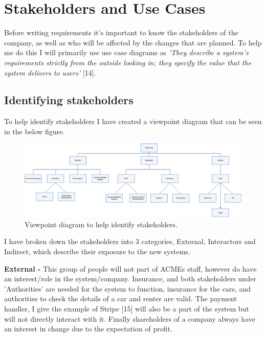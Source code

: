 \section{Stakeholders and Use Cases}
  Before writing requirements it's important to know the stakeholders of the company, as well as who will be affected by the changes that are planned.
  To help me do this I will primarily use use case diagrams as \textit{'They describe a system's requirements strictly from the outside looking in;
  they specify the value that the system delivers to users'} [14].

  \subsection{Identifying stakeholders}
    To help identify stakeholders I have created a viewpoint diagram that can be seen in the below figure.
    \begin{figure}[H]
      \centering
      \includegraphics[width=12cm]{diagrams/viewpoints.drawio.png}
      \caption{Viewpoint diagram to help identify stakeholders.}
      \label{fig:viewpoint}
    \end{figure}

    I have broken down the stakeholders into 3 categories, External, Interactors and Indirect, which describe their
    exposure to the new systems.

    \vspace{0.2cm}

    \noindent\textbf{External -} This group of people will not part of ACMEs staff, however do have an interest/role in the system/company. Insurance, 
    and both stakeholders under 'Authorities' are needed for the system to function, insurance for the cars, and authorities to
    check the details of a car and renter are valid. The payment handler, I give the example of Stripe [15] will also be a part of the system
    but will not directly interact with it. Finally shareholders of a company always have an interest in change due to the expectation of profit.

    \vspace{0.2cm}

